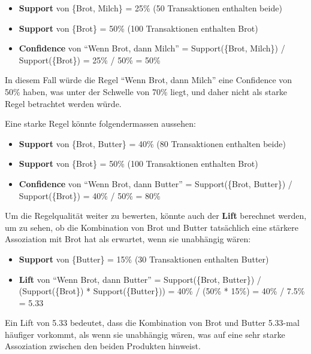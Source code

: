 \begin{myexample}
    \begin{itemize}
        \item \textbf{Support} von \{Brot, Milch\} = 25\% (50 Transaktionen enthalten beide)
        \item \textbf{Support} von \{Brot\} = 50\% (100 Transaktionen enthalten Brot)
        \item \textbf{Confidence} von \enquote{Wenn Brot, dann Milch} = Support(\{Brot, Milch\}) / Support(\{Brot\}) = 25\% / 50\% = 50\%
    \end{itemize}
    In diesem Fall würde die Regel \enquote{Wenn Brot, dann Milch} eine Confidence von 50\% haben, was unter der Schwelle von 70\% liegt, und daher nicht als starke Regel betrachtet werden würde.

    Eine starke Regel könnte folgendermassen aussehen:
    \begin{itemize}
        \item \textbf{Support} von \{Brot, Butter\} = 40\% (80 Transaktionen enthalten beide)
        \item \textbf{Support} von \{Brot\} = 50\% (100 Transaktionen enthalten Brot)
        \item \textbf{Confidence} von \enquote{Wenn Brot, dann Butter} = Support(\{Brot, Butter\}) / Support(\{Brot\}) = 40\% / 50\% = 80\%
    \end{itemize}

    Um die Regelqualität weiter zu bewerten, könnte auch der \textbf{Lift} berechnet werden, um zu sehen, ob die Kombination von Brot und Butter tatsächlich eine stärkere Assoziation mit Brot hat als erwartet, wenn sie unabhängig wären:

    \begin{itemize}
        \item \textbf{Support} von \{Butter\} = 15\% (30 Transaktionen enthalten Butter)
        \item \textbf{Lift} von \enquote{Wenn Brot, dann Butter} = Support(\{Brot, Butter\}) / (Support(\{Brot\}) * Support(\{Butter\})) = 40\% / (50\% * 15\%) = 40\% / 7.5\% = 5.33
    \end{itemize}

    Ein Lift von 5.33 bedeutet, dass die Kombination von Brot und Butter 5.33-mal häufiger vorkommt, als wenn sie unabhängig wären, was auf eine sehr starke Assoziation zwischen den beiden Produkten hinweist.
\end{myexample}


